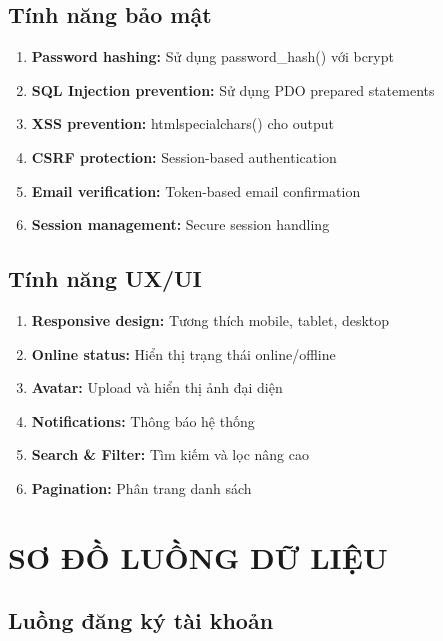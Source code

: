 \documentclass[a4paper,12pt]{article}
\begin{document}
\subsection{Tính năng bảo mật}

\begin{enumerate}
    \item \textbf{Password hashing:} Sử dụng password\_hash() với bcrypt
    \item \textbf{SQL Injection prevention:} Sử dụng PDO prepared statements
    \item \textbf{XSS prevention:} htmlspecialchars() cho output
    \item \textbf{CSRF protection:} Session-based authentication
    \item \textbf{Email verification:} Token-based email confirmation
    \item \textbf{Session management:} Secure session handling
\end{enumerate}

\subsection{Tính năng UX/UI}

\begin{enumerate}
    \item \textbf{Responsive design:} Tương thích mobile, tablet, desktop
    \item \textbf{Online status:} Hiển thị trạng thái online/offline
    \item \textbf{Avatar:} Upload và hiển thị ảnh đại diện
    \item \textbf{Notifications:} Thông báo hệ thống
    \item \textbf{Search \& Filter:} Tìm kiếm và lọc nâng cao
    \item \textbf{Pagination:} Phân trang danh sách
\end{enumerate}

\section{SƠ ĐỒ LUỒNG DỮ LIỆU}

\subsection{Luồng đăng ký tài khoản}
\end{document}
